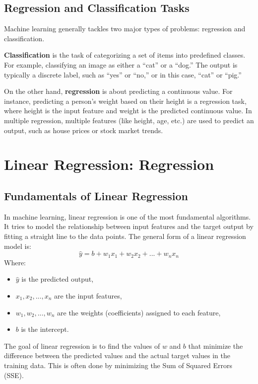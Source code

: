 \subsection{Regression and Classification Tasks}
\begin{flushleft}
    \large Machine learning generally tackles two major types of problems: regression and classification. \break
    
    \textbf{Classification} is the task of categorizing a set of items into predefined classes. For example, classifying an image as either a “cat” or a “dog.” The output is typically a discrete label, such as “yes” or “no,” or in this case, “cat” or “pig.” \break
    
    On the other hand, \textbf{regression} is about predicting a continuous value. For instance, predicting a person’s weight based on their height is a regression task, where height is the input feature and weight is the predicted continuous value. In multiple regression, multiple features (like height, age, etc.) are used to predict an output, such as house prices or stock market trends.
\end{flushleft}

\section{Linear Regression: Regression}
\subsection{Fundamentals of Linear Regression}
\begin{flushleft}
    \large In machine learning, linear regression is one of the most fundamental algorithms. It tries to model the relationship between input features and the target output by fitting a straight line to the data points. The general form of a linear regression model is:
        $$\hat{y} = b + w_1x_1 + w_2x_2 + ... + w_nx_n$$
    Where:
    \begin{itemize}
        \item \( \hat{y} \) is the predicted output,
        \item \( x_1, x_2, ..., x_n \) are the input features,
        \item \( w_1, w_2, ..., w_n \) are the weights (coefficients) assigned to each feature,
        \item \( b \) is the intercept.
    \end{itemize}
    The goal of linear regression is to find the values of \( w \) and \( b \) that minimize the difference between the predicted values and the actual target values in the training data. This is often done by minimizing the Sum of Squared Errors (SSE).
\end{flushleft}
